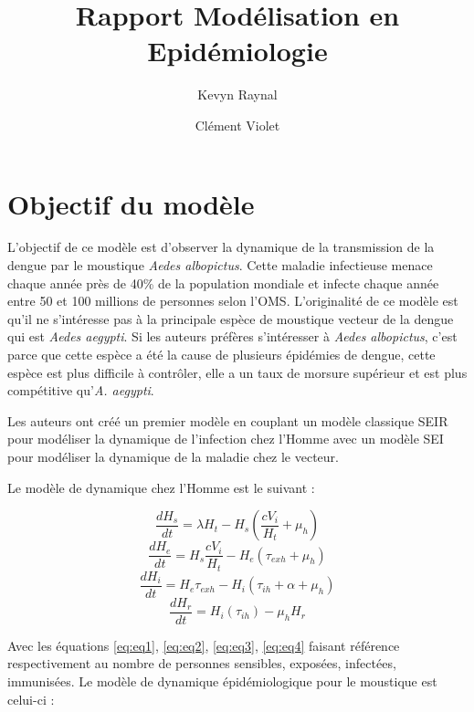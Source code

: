 \documentclass[
  12pt,
  french,
  oneside]{article}
\title{Rapport Modélisation en Epidémiologie}
\author{Kevyn Raynal \and Clément Violet}
\date{}
\begin{document}
\maketitle

\hypertarget{objectif-du-moduxe8le}{%
\section{Objectif du modèle}\label{objectif-du-moduxe8le}}

L'objectif de ce modèle est d'observer la dynamique de la transmission
de la dengue par le moustique \emph{Aedes albopictus}. Cette maladie
infectieuse menace chaque année près de 40\% de la population mondiale
et infecte chaque année entre 50 et 100 millions de personnes selon
l'OMS. L'originalité de ce modèle est qu'il ne s'intéresse pas à la
principale espèce de moustique vecteur de la dengue qui est \emph{Aedes
aegypti}. Si les auteurs préfères s'intéresser à \emph{Aedes
albopictus}, c'est parce que cette espèce a été la cause de plusieurs
épidémies de dengue, cette espèce est plus difficile à contrôler, elle a
un taux de morsure supérieur et est plus compétitive qu'\emph{A.
aegypti}.

Les auteurs ont créé un premier modèle en couplant un modèle classique
SEIR pour modéliser la dynamique de l'infection chez l'Homme avec un
modèle SEI pour modéliser la dynamique de la maladie chez le vecteur.

Le modèle de dynamique chez l'Homme est le suivant :

\begin{equation} \frac{dH_s}{dt} = \lambda H_t - H_s \left(\frac{cV_i}{H_t} + \mu_h\right)\label{eq:eq1}\end{equation}
\begin{equation} \frac{dH_e}{dt} = H_s \frac{cV_i}{H_t} - H_e (\tau_{exh} + \mu_h)\label{eq:eq2}\end{equation}
\begin{equation} \frac{dH_i}{dt} = H_e\tau_{exh} - H_i\left(\tau_{ih} + \alpha + \mu_h\right)\label{eq:eq3}\end{equation}
\begin{equation} \frac{dH_r}{dt} = H_i\left(\tau_{ih}\right) - \mu_h H_r\label{eq:eq4}\end{equation}

Avec les équations \ref{eq:eq1}, \ref{eq:eq2}, \ref{eq:eq3},
\ref{eq:eq4} faisant référence respectivement au nombre de personnes
sensibles, exposées, infectées, immunisées. Le modèle de dynamique
épidémiologique pour le moustique est celui-ci :
\end{document}
